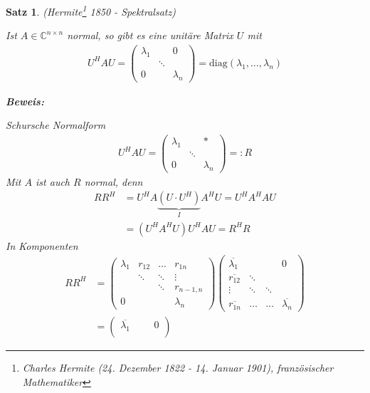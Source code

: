 \documentclass[%
a4paper,
11pt,		%
]
{scrartcl}
\newcommand{\C}{\mathbb{C}}
\theoremstyle{plain}
\theoremstyle{plain}
\newtheorem{mysatz}[mydef]{Satz}
\theoremstyle{plain}
\theoremstyle{plain}
\begin{document}
\begin{mysatz} (Hermite\footnote{Charles Hermite (24. Dezember 1822 - 14. Januar 1901), französischer Mathematiker} 1850 - \textit{Spektralsatz})

Ist $A \in \C^{n \times n}$ normal, so gibt es eine unitäre Matrix $U$ mit
\begin{align*}
U^H A U = 
\begin{pmatrix}
\lambda_1 & & 0\\
& \ddots & \\
0 & & \lambda_n
\end{pmatrix}
=
\text{diag}(\lambda_1,\dots,\lambda_n)
\end{align*}


\textbf{Beweis:}

Schursche Normalform
\begin{align*}
U^H A U = 
\begin{pmatrix}
\lambda_1 & & *\\
& \ddots & \\
0 & & \lambda_n
\end{pmatrix}
=: R
\end{align*}
Mit $A$ ist auch $R$ normal, denn
\begin{align*}
RR^H & = U^H A \underbrace{(U \cdot U^H)}_{I} A^H U = U^H A^H A U\\
 & = (U^H A^H U) U^H A U  = R^H R
\end{align*}
In Komponenten
\begin{align*}
R R^H & = 
\begin{pmatrix}
\lambda_1   & r_{12}    & \dots     & r_{1n}\\
            & \ddots    & \ddots    & \vdots\\
            &           & \ddots    & r_{n-1,n}\\
0           &           &           & \lambda_n
\end{pmatrix}
\begin{pmatrix}
\overline{\lambda_1}    & & & 0\\
\overline{r_{12}}       & \ddots\\
\vdots                  & \ddots & \ddots\\
\overline{r_{1n}}       & \dots & \dots & \overline{\lambda_n}
\end{pmatrix}\\
& = 
\begin{pmatrix}
\overline{\lambda_1}    & & & 0\\

\end{pmatrix}
\end{align*}
\end{mysatz}
\end{document}
